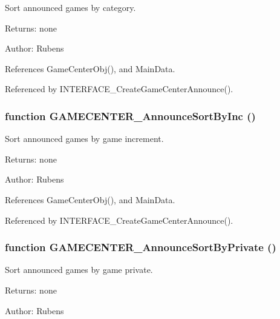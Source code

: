 Sort announced games by category. 

\begin{Desc}
\item[Returns:]none \end{Desc}
\begin{Desc}
\item[Author:]Rubens \end{Desc}


References GameCenterObj(), and MainData.

Referenced by INTERFACE\_\-CreateGameCenterAnnounce().
\subsubsection[GAMECENTER\_\-AnnounceSortByInc]{\setlength{\rightskip}{0pt plus 5cm}function GAMECENTER\_\-AnnounceSortByInc ()}\label{gamecenter_2gamecenter_8js_bc75c833515626ef63e3d314ff6addf0}


Sort announced games by game increment. 

\begin{Desc}
\item[Returns:]none \end{Desc}
\begin{Desc}
\item[Author:]Rubens \end{Desc}


References GameCenterObj(), and MainData.

Referenced by INTERFACE\_\-CreateGameCenterAnnounce().
\subsubsection[GAMECENTER\_\-AnnounceSortByPrivate]{\setlength{\rightskip}{0pt plus 5cm}function GAMECENTER\_\-AnnounceSortByPrivate ()}\label{gamecenter_2gamecenter_8js_ca97edd3dc82c4869634fd0d76f88e07}


Sort announced games by game private. 

\begin{Desc}
\item[Returns:]none \end{Desc}
\begin{Desc}
\item[Author:]Rubens \end{Desc}


